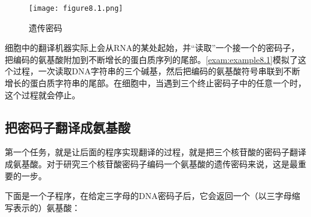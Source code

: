 \begin{figure}
  \centering
  \texttt{[image: figure8.1.png]}
  \caption{遗传密码}
  \label{fig:figure8.1}
\end{figure}

细胞中的翻译机器实际上会从RNA的某处起始，并“读取”一个接一个的密码子，把编码的氨基酸附加到不断增长的蛋白质序列的尾部。\autoref{exam:example8.1}模拟了这个过程，一次读取DNA字符串的三个碱基，然后把编码的氨基酸符号串联到不断增长的蛋白质字符串的尾部。在细胞中，当遇到三个终止密码子中的任意一个时，这个过程就会停止。

\subsection{把密码子翻译成氨基酸}
第一个任务，就是让后面的程序实现翻译的过程，就是把三个核苷酸的密码子翻译成氨基酸。对于研究三个核苷酸密码子编码一个氨基酸的遗传密码来说，这是最重要的一步。

下面是一个子程序，在给定三字母的DNA密码子后，它会返回一个（以三字母缩写表示的）氨基酸：

